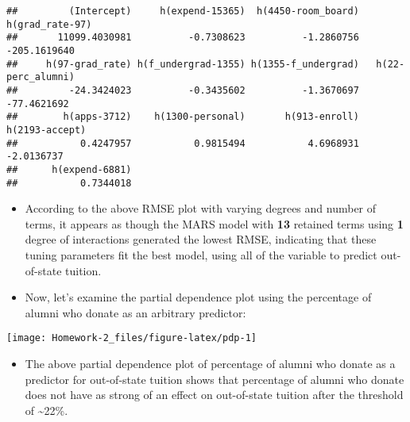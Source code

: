 \documentclass[
]{article}
\newenvironment{Shaded}{\begin{snugshade}}{\end{snugshade}}
\newcommand{\DataTypeTok}[1]{\textcolor[rgb]{0.13,0.29,0.53}{#1}}
\newcommand{\DecValTok}[1]{\textcolor[rgb]{0.00,0.00,0.81}{#1}}
\newcommand{\KeywordTok}[1]{\textcolor[rgb]{0.13,0.29,0.53}{\textbf{#1}}}
\newcommand{\NormalTok}[1]{#1}
\newcommand{\OperatorTok}[1]{\textcolor[rgb]{0.81,0.36,0.00}{\textbf{#1}}}
\newcommand{\StringTok}[1]{\textcolor[rgb]{0.31,0.60,0.02}{#1}}
\providecommand{\tightlist}{%
  \setlength{\itemsep}{0pt}\setlength{\parskip}{0pt}}
\begin{document}
\begin{Shaded}
\end{Shaded}

\begin{verbatim}
##         (Intercept)     h(expend-15365)  h(4450-room_board)     h(grad_rate-97) 
##       11099.4030981          -0.7308623          -1.2860756        -205.1619640 
##     h(97-grad_rate) h(f_undergrad-1355) h(1355-f_undergrad)   h(22-perc_alumni) 
##         -24.3424023          -0.3435602          -1.3670697         -77.4621692 
##        h(apps-3712)    h(1300-personal)       h(913-enroll)      h(2193-accept) 
##           0.4247957           0.9815494           4.6968931          -2.0136737 
##      h(expend-6881) 
##           0.7344018
\end{verbatim}

\begin{itemize}
\item
  According to the above RMSE plot with varying degrees and number of
  terms, it appears as though the MARS model with \textbf{13} retained
  terms using \textbf{1} degree of interactions generated the lowest
  RMSE, indicating that these tuning parameters fit the best model,
  using all of the variable to predict out-of-state tuition.
\item
  Now, let's examine the partial dependence plot using the percentage of
  alumni who donate as an arbitrary predictor:
\end{itemize}

\begin{Shaded}
\end{Shaded}

\texttt{[image: Homework-2\_files/figure-latex/pdp-1]}

\begin{itemize}
\tightlist
\item
  The above partial dependence plot of percentage of alumni who donate
  as a predictor for out-of-state tuition shows that percentage of
  alumni who donate does not have as strong of an effect on out-of-state
  tuition after the threshold of \textasciitilde22\%.
\end{itemize}
\end{document}

